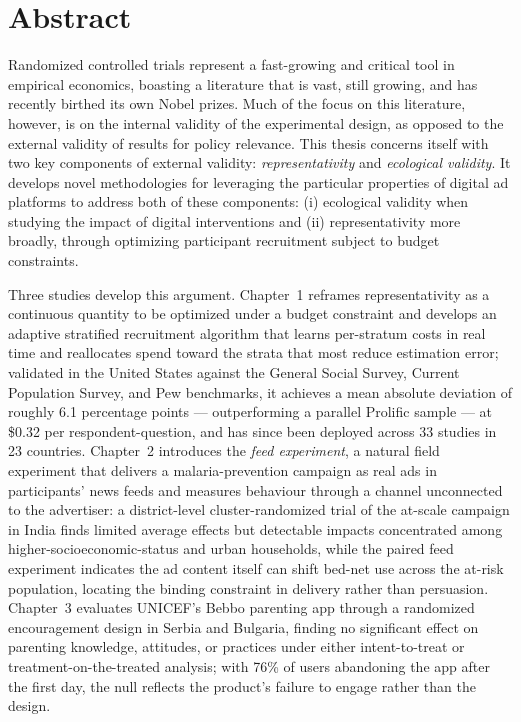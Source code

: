 \chapter*{Abstract}

Randomized controlled trials represent a fast-growing and critical tool in empirical
economics, boasting a literature that is vast, still growing, and has recently birthed
its own Nobel prizes. Much of the focus on this literature, however, is on the internal
validity of the experimental design, as opposed to the external validity of results for
policy relevance. This thesis concerns itself with two key components of external
validity: \emph{representativity} and \emph{ecological validity}. It develops novel
methodologies for leveraging the particular properties of digital ad platforms to
address both of these components: (i) ecological validity when studying the impact of
digital interventions and (ii) representativity more broadly, through optimizing
participant recruitment subject to budget constraints.

Three studies develop this argument. Chapter~1 reframes representativity as a continuous
quantity to be optimized under a budget constraint and develops an adaptive stratified
recruitment algorithm that learns per-stratum costs in real time and reallocates spend
toward the strata that most reduce estimation error; validated in the United States
against the General Social Survey, Current Population Survey, and Pew benchmarks, it
achieves a mean absolute deviation of roughly 6.1 percentage points --- outperforming a
parallel Prolific sample --- at \$0.32 per respondent-question, and has since been
deployed across 33 studies in 23 countries. Chapter~2 introduces the \emph{feed
experiment}, a natural field experiment that delivers a malaria-prevention campaign as
real ads in participants' news feeds and measures behaviour through a channel unconnected
to the advertiser: a district-level cluster-randomized trial of the at-scale campaign in
India finds limited average effects but detectable impacts concentrated among
higher-socioeconomic-status and urban households, while the paired feed experiment
indicates the ad content itself can shift bed-net use across the at-risk population,
locating the binding constraint in delivery rather than persuasion. Chapter~3 evaluates
UNICEF's Bebbo parenting app through a randomized encouragement design in Serbia and
Bulgaria, finding no significant effect on parenting knowledge, attitudes, or practices
under either intent-to-treat or treatment-on-the-treated analysis; with 76\% of users
abandoning the app after the first day, the null reflects the product's failure to engage
rather than the design. 


\cleardoublepage
